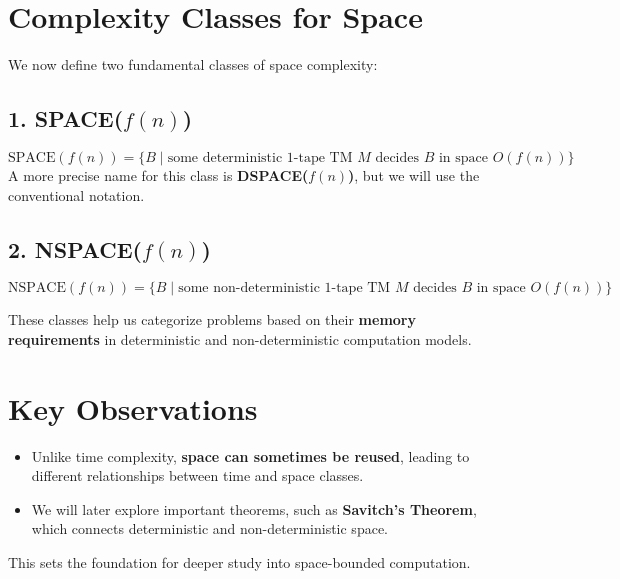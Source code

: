 \documentclass{article}
\begin{document}
\section*{Complexity Classes for Space}

We now define two fundamental classes of space complexity:

\subsection*{1. SPACE(\( f(n) \))}
\[
\text{SPACE}(f(n)) = \{ B \mid \text{some deterministic 1-tape TM } M \text{ decides } B \text{ in space } O(f(n)) \}
\]
A more precise name for this class is \textbf{DSPACE(\( f(n) \))}, but we will use the conventional notation.

\subsection*{2. NSPACE(\( f(n) \))}
\[
\text{NSPACE}(f(n)) = \{ B \mid \text{some non-deterministic 1-tape TM } M \text{ decides } B \text{ in space } O(f(n)) \}
\]

These classes help us categorize problems based on their \textbf{memory requirements} in deterministic and non-deterministic computation models.

\section*{Key Observations}
\begin{itemize}
    \item Unlike time complexity, \textbf{space can sometimes be reused}, leading to different relationships between time and space classes.
    \item We will later explore important theorems, such as \textbf{Savitch's Theorem}, which connects deterministic and non-deterministic space.
\end{itemize}

This sets the foundation for deeper study into space-bounded computation.
\end{document}
